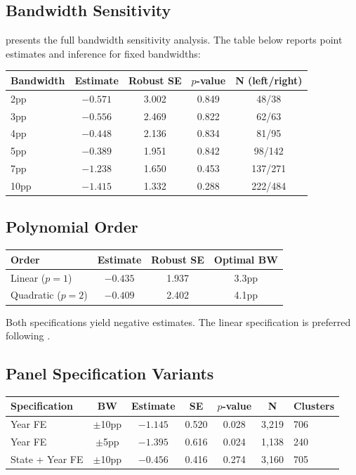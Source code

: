 \documentclass[12pt]{article}
\begin{document}
\subsection{Bandwidth Sensitivity}

 presents the full bandwidth sensitivity analysis. The table below reports point estimates and inference for fixed bandwidths:

\begin{table}[H]
\centering
\begin{tabular}{lcccc}
\toprule
Bandwidth & Estimate & Robust SE & $p$-value & N (left/right) \\
\midrule
2pp & $-0.571$ & 3.002 & 0.849 & 48/38 \\
3pp & $-0.556$ & 2.469 & 0.822 & 62/63 \\
4pp & $-0.448$ & 2.136 & 0.834 & 81/95 \\
5pp & $-0.389$ & 1.951 & 0.842 & 98/142 \\
7pp & $-1.238$ & 1.650 & 0.453 & 137/271 \\
10pp & $-1.415$ & 1.332 & 0.288 & 222/484 \\
\bottomrule
\end{tabular}
\end{table}

\subsection{Polynomial Order}

\begin{table}[H]
\centering
\begin{tabular}{lccc}
\toprule
Order & Estimate & Robust SE & Optimal BW \\
\midrule
Linear ($p=1$) & $-0.435$ & 1.937 & 3.3pp \\
Quadratic ($p=2$) & $-0.409$ & 2.402 & 4.1pp \\
\bottomrule
\end{tabular}
\end{table}

Both specifications yield negative estimates. The linear specification is preferred following \citet{gelman2019high}.

\subsection{Panel Specification Variants}

\begin{table}[H]
\centering
\begin{tabular}{lccccc}
\toprule
Specification & BW & Estimate & SE & $p$-value & N & Clusters \\
\midrule
Year FE & $\pm$10pp & $-1.145$ & 0.520 & 0.028 & 3,219 & 706 \\
Year FE & $\pm$5pp & $-1.395$ & 0.616 & 0.024 & 1,138 & 240 \\
State + Year FE & $\pm$10pp & $-0.456$ & 0.416 & 0.274 & 3,160 & 705 \\
\bottomrule
\end{tabular}
\end{table}
\end{document}
